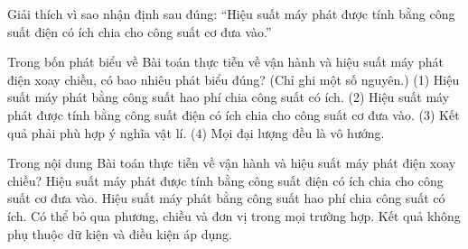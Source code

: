 \begin{bt}
Giải thích vì sao nhận định sau đúng: “Hiệu suất máy phát được tính bằng công suất điện có ích chia cho công suất cơ đưa vào.”
\end{bt}

\begin{ex}
Trong bốn phát biểu về Bài toán thực tiễn về vận hành và hiệu suất máy phát điện xoay chiều, có bao nhiêu phát biểu đúng? (Chỉ ghi một số nguyên.) (1) Hiệu suất máy phát bằng công suất hao phí chia công suất có ích. (2) Hiệu suất máy phát được tính bằng công suất điện có ích chia cho công suất cơ đưa vào. (3) Kết quả phải phù hợp ý nghĩa vật lí. (4) Mọi đại lượng đều là vô hướng.
\end{ex}

\begin{ex}
Trong nội dung Bài toán thực tiễn về vận hành và hiệu suất máy phát điện xoay chiều?
\choice
{\True Hiệu suất máy phát được tính bằng công suất điện có ích chia cho công suất cơ đưa vào.}
{Hiệu suất máy phát bằng công suất hao phí chia công suất có ích.}
{Có thể bỏ qua phương, chiều và đơn vị trong mọi trường hợp.}
{Kết quả không phụ thuộc dữ kiện và điều kiện áp dụng.}
\end{ex}

